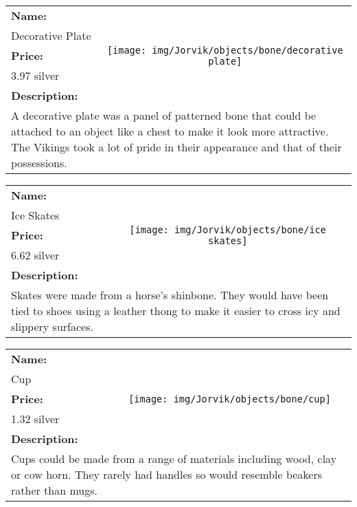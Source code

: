 \begin{table}[ht!]
	\centering
	\begin{tabular}{ p{3cm} c }\toprule
		\textbf{Name:} & \multirow{5}{*}{\texttt{[image: img/Jorvik/objects/bone/decorative plate]}}\\
		Decorative Plate & \\ 
		\textbf{Price:} & \\
		3.97 silver & \\ 
		\textbf{Description:} & \\
		\multicolumn{2}{p{12cm}}{A decorative plate was a panel of patterned bone that could be attached to an object like a chest to make it look more attractive. The Vikings took a lot of pride in their appearance and that of their possessions.}\\
		\bottomrule
	\end{tabular}
\end{table}

\begin{table}[ht!]
	\centering
	\begin{tabular}{ p{3cm} c }\toprule
		\textbf{Name:} & \multirow{5}{*}{\texttt{[image: img/Jorvik/objects/bone/ice skates]}}\\
		Ice Skates & \\ 
		\textbf{Price:} & \\
		6.62 silver & \\ 
		\textbf{Description:} & \\
		\multicolumn{2}{p{12cm}}{Skates were made from a horse's shinbone. They would have been tied to shoes using a leather thong to make it easier to cross icy and slippery surfaces.}\\
		\bottomrule
	\end{tabular}
\end{table}

\begin{table}[ht!]
	\centering
	\begin{tabular}{ p{3cm} c }\toprule
		\textbf{Name:} & \multirow{5}{*}{\texttt{[image: img/Jorvik/objects/bone/cup]}}\\
		Cup & \\ 
		\textbf{Price:} & \\
		1.32 silver & \\ 
		\textbf{Description:} & \\
		\multicolumn{2}{p{12cm}}{Cups could be made from a range of materials including wood, clay or cow horn. They rarely had handles so would resemble beakers rather than mugs.}\\
		\bottomrule
	\end{tabular}
\end{table}

